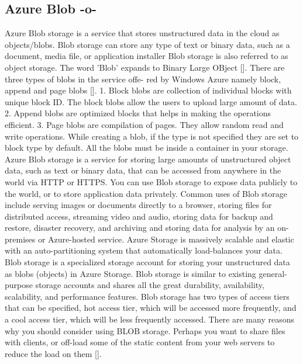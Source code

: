   
\subsection{Azure Blob -o-}

Azure Blob storage is a service that stores unstructured data in the
cloud as objects/blobs. Blob storage can store any type of text or
binary data, such as a document, media file, or application installer
Blob storage is also referred to as object storage. The word 'Blob'
expands to Binary Large OBject [\cite{www-azure-3}]. There are three
types of blobs in the service offe- red by Windows Azure namely block,
append and page blobs [\cite{www-azure-2}].  1. Block blobs are
collection of individual blocks with unique block ID.  The block blobs
allow the users to upload large amount of data.  2. Append blobs are
optimized blocks that helps in making the operations efficient.
3. Page blobs are compilation of pages. They allow random read and
write operations. While creating a blob, if the type is not specified
they are set to block type by default. All the blobs must be inside a
container in your storage.  Azure Blob storage is a service for
storing large amounts of unstructured object data, such as text or
binary data, that can be accessed from anywhere in the world via HTTP
or HTTPS. You can use Blob storage to expose data publicly to the
world, or to store application data privately. Common uses of Blob
storage include serving images or documents directly to a browser,
storing files for distributed access, streaming video and audio,
storing data for backup and restore, disaster recovery, and archiving
and storing data for analysis by an on-premises or Azure-hosted
service.  Azure Storage is massively scalable and elastic with an
auto-partitioning system that automatically load-balances your
data. Blob storage is a specialized storage account for storing your
unstructured data as blobs (objects) in Azure Storage. Blob storage is
similar to existing general-purpose storage accounts and shares all
the great durability, availability, scalability, and performance
features. Blob storage has two types of access tiers that can be
specified, hot access tier, which will be accessed more frequently,
and a cool access tier, which will be less frequently accessed. There
are many reasons why you should consider using BLOB storage. Perhaps
you want to share files with clients, or off-load some of the static
content from your web servers to reduce the load on
them [\cite{www-azure-3}].



